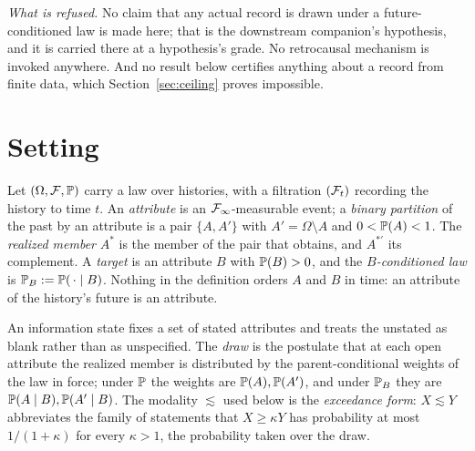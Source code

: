 \emph{What is refused.} No claim that any actual record is drawn under a
future-conditioned law is made here; that is the downstream companion's
hypothesis, and it is carried there at a hypothesis's grade. No
retrocausal mechanism is invoked anywhere. And no result below certifies
anything about a record from finite data, which Section~\ref{sec:ceiling}
proves impossible.

\section{Setting}\label{sec:setting}

\begin{definition}
\label{def:setting}
Let $(\Omega,\mathcal{F},\mathbb{P})$ carry a law over histories, with a filtration
$(\mathcal{F}_t)$ recording the history to time $t$. An \emph{attribute} is an
$\mathcal{F}_\infty$-measurable event; a \emph{binary partition} of the past by
an attribute is a pair $\{A,A'\}$ with $A'=\Omega\setminus A$ and
$0<\mathbb{P}(A)<1$. The \emph{realized member} $A^\ast$ is the member of the
pair that obtains, and $A^{\ast\prime}$ its complement. A \emph{target} is
an attribute $B$ with $\mathbb{P}(B)>0$, and the \emph{$B$-conditioned law} is
$\mathbb{P}_B:=\mathbb{P}(\,\cdot\mid B)$. Nothing in the definition orders $A$ and $B$
in time: an attribute of the history's future is an attribute.
\end{definition}

\begin{definition}
\label{def:draw}
An information state fixes a set of stated attributes and treats the
unstated as blank rather than as unspecified. The \emph{draw} is the
postulate that at each open attribute the realized member is distributed
by the parent-conditional weights of the law in force; under $\mathbb{P}$ the
weights are $\mathbb{P}(A),\mathbb{P}(A')$, and under $\mathbb{P}_B$ they are
$\mathbb{P}(A\mid B),\mathbb{P}(A'\mid B)$. The modality $\lesssim$ used below is the
\emph{exceedance form}: $X\lesssim Y$ abbreviates the family of statements
that $X\ge\kappa Y$ has probability at most $1/(1+\kappa)$ for every
$\kappa>1$, the probability taken over the draw.
\end{definition}

